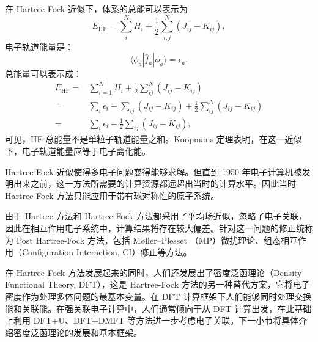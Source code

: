 在 Hartree-Fock 近似下，体系的总能可以表示为
\begin{equation}
E_{\mathrm{HF}}=\sum_i^N H_i+\frac{1}{2}\sum_{i,j}^N(J_{ij}-K_{ij}),
\end{equation}
电子轨道能量是：
\begin{equation}
\langle\phi_a|\hat f_a|\phi_a\rangle=\epsilon_a.
\end{equation}
总能量可以表示成：
\begin{equation}
\begin{aligned}
E_{\mathrm{HF}}=&\sum_{i=1}^NH_i+\frac{1}{2}\sum_{ij}^N(J_{ij}-K_{ij})\\
=&\sum_i\epsilon_i-\sum_{ij}(J_{ij}-K_{ij})+\frac{1}{2}\sum_{ij}^N(J_{ij}-K_{ij})\\
=&\sum_i\epsilon_i-\frac{1}{2}\sum_{ij}(J_{ij}-K_{ij}),
\end{aligned}
\end{equation}
可见，HF 总能量不是单粒子轨道能量之和。Koopmans 定理表明，在这一近似下，电子轨道能量应等于电子离化能。

Hartree-Fock 近似使得多电子问题变得能够求解。但直到 1950 年电子计算机被发明出来之前，这一方法所需要的计算资源都远超出当时的计算水平。因此当时 Hartree-Fock 方法只能应用于带有球对称性的原子系统\cite{PhysRev.81.385}。

由于 Hartree 方法和 Hartree-Fock 方法都采用了平均场近似，忽略了电子关联，因此在相互作用电子系统中，计算结果将存在较大偏差。针对这一问题的修正统称为 Post Hartree-Fock 方法，包括 Møller–Plesset （MP）微扰理论\cite{PhysRev.46.618}、组态相互作用（Configuration Interaction, CI）修正\cite{DAVIDSHERRILL1999143}等方法。

在 Hartree-Fock 方法发展起来的同时，人们还发展出了密度泛函理论（Density Functional Theory, DFT），这是 Hartree-Fock 方法的另一种替代方案，它将电子密度作为处理多体问题的最基本变量。在 DFT 计算框架下人们能够同时处理交换能和关联能。在强关联电子计算中，人们通常倾向于从 DFT 计算出发，在此基础上利用 DFT+U、DFT+DMFT 等方法进一步考虑电子关联。下一小节将具体介绍密度泛函理论的发展和基本框架。